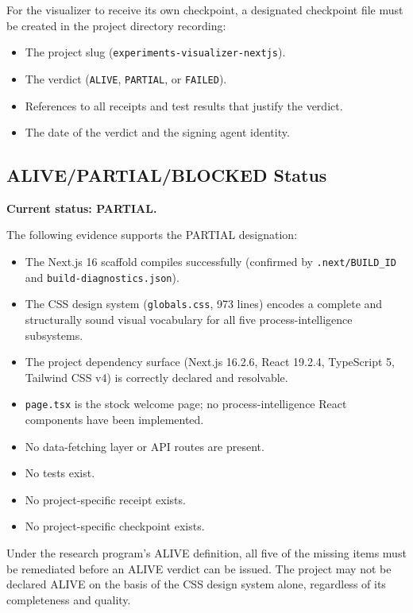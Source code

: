 For the visualizer to receive its own checkpoint, a designated checkpoint file must be created
in the project directory recording:
\begin{itemize}
  \item The project slug (\texttt{experiments-visualizer-nextjs}).
  \item The verdict (\texttt{ALIVE}, \texttt{PARTIAL}, or \texttt{FAILED}).
  \item References to all receipts and test results that justify the verdict.
  \item The date of the verdict and the signing agent identity.
\end{itemize}

\subsection{ALIVE/PARTIAL/BLOCKED Status}
\label{sec:experiments-visualizer-nextjs-evidence-status}

\textbf{Current status: PARTIAL.}

The following evidence supports the PARTIAL designation:

\begin{itemize}
  \item[\checkmark] The Next.js 16 scaffold compiles successfully (confirmed by
        \texttt{.next/BUILD\_ID} and \texttt{build-diagnostics.json}).
  \item[\checkmark] The CSS design system (\texttt{globals.css}, 973 lines) encodes a
        complete and structurally sound visual vocabulary for all five process-intelligence
        subsystems.
  \item[\checkmark] The project dependency surface (Next.js 16.2.6, React 19.2.4,
        TypeScript 5, Tailwind CSS v4) is correctly declared and resolvable.
  \item[$\times$] \texttt{page.tsx} is the stock welcome page; no process-intelligence
        React components have been implemented.
  \item[$\times$] No data-fetching layer or API routes are present.
  \item[$\times$] No tests exist.
  \item[$\times$] No project-specific receipt exists.
  \item[$\times$] No project-specific checkpoint exists.
\end{itemize}

Under the research program's ALIVE definition, all five of the missing items must be
remediated before an ALIVE verdict can be issued. The project may not be declared ALIVE
on the basis of the CSS design system alone, regardless of its completeness and quality.

